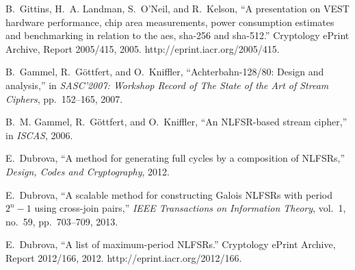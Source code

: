 \documentclass[9pt,conference]{IEEEtran} \usepackage{times}
\begin{document}
\begin{thebibliography}{10}
B.~Gittins, H.~A. Landman, S.~O'Neil, and R.~Kelson, ``A presentation on {VEST}
  hardware performance, chip area measurements, power consumption estimates and
  benchmarking in relation to the aes, sha-256 and sha-512.'' Cryptology ePrint
  Archive, Report 2005/415, 2005.
\newblock http://eprint.iacr.org/2005/415.

B.~Gammel, R.~G{\"o}ttfert, and O.~Kniffler, ``Achterbahn-128/80: Design and
  analysis,'' in {\em SASC'2007: Workshop Record of The State of the Art of
  Stream Ciphers}, pp.~152--165, 2007.

B.~M. Gammel, R.~G{\"o}ttfert, and O.~Kniffler, ``An {NLFSR}-based stream
  cipher,'' in {\em ISCAS}, 2006.

E.~Dubrova, ``A method for generating full cycles by a composition of
  {NLFSR}s,'' {\em Design, Codes and Cryptography}, 2012.

E.~Dubrova, ``A scalable method for constructing {G}alois {NLFSR}s with period
  $2^n-1$ using cross-join pairs,'' {\em IEEE Transactions on Information
  Theory}, vol.~1, no.~59, pp.~703--709, 2013.

E.~Dubrova, ``A list of maximum-period {NLFSR}s.'' Cryptology ePrint Archive,
  Report 2012/166, 2012.
\newblock http://eprint.iacr.org/2012/166.

\end{thebibliography}
\end{document}
